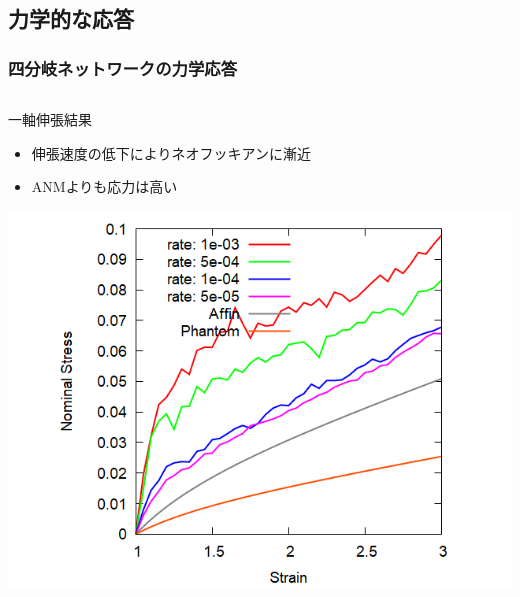 \documentclass[12pt, dvipdfmx]{beamer}
\begin{document}
\subsection{力学的な応答}
\begin{frame}
	\frametitle{四分岐ネットワークの力学応答}
		\begin{columns}[T, onlytextwidth]
				\begin{block}{一軸伸張結果}
					\begin{itemize}
						\item 伸張速度の低下によりネオフッキアンに漸近
						\item ANMよりも応力は高い
					\end{itemize}
					\includegraphics[width=\textwidth]{N48_C4_M3.png}
				\end{block}
				

\end{columns}
\end{frame}
\end{document}
